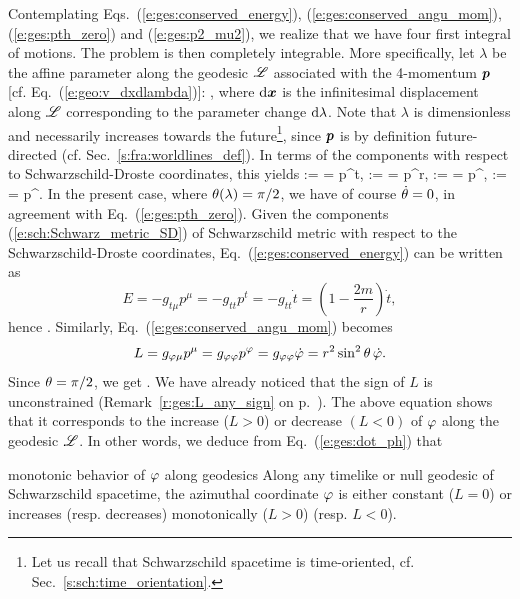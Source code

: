 Contemplating Eqs.~(\ref{e:ges:conserved_energy}), (\ref{e:ges:conserved_angu_mom}),
(\ref{e:ges:pth_zero}) and (\ref{e:ges:p2_mu2}), we realize that we have
four first integral of motions. The problem is then completely integrable.
More specifically, let $\lambda$ be the affine parameter along the geodesic
$\mathscr{L}$ associated with the 4-momentum $\bm{p}$ [cf. Eq.~(\ref{e:geo:v_dxdlambda})]:
\be \label{e:ges:def_lambda}
   ,
\ee
where  $\mathrm{d}\bm{x}$ is the infinitesimal displacement along $\mathscr{L}$ corresponding
to the parameter change $\mathrm{d}\lambda$. Note that $\lambda$ is dimensionless
and necessarily increases towards the future\footnote{Let us recall
that Schwarzschild spacetime is time-oriented, cf. Sec.~\ref{s:sch:time_orientation}.},
since $\bm{p}$ is by definition future-directed (cf. Sec.~\ref{s:fra:worldlines_def}).
In terms of the components with respect to Schwarzschild-Droste coordinates,
this yields
\be \label{e:ges:comp_4_momentum}
     :=  = p^t,\qquad
     :=  = p^r,\qquad
    \dot{\th} := \frac{\D \th}{\D\lambda} = p^\th,\qquad
    \dot{\ph} := \frac{\D \ph}{\D\lambda} = p^\ph .
\ee
In the present case, where $\theta(\lambda)=\pi/2$, we have of course $\dot{\theta}=0$,
in agreement with Eq.~(\ref{e:ges:pth_zero}).
Given the components (\ref{e:sch:Schwarz_metric_SD}) of Schwarzschild metric
with respect to the Schwarzschild-Droste coordinates,
Eq.~(\ref{e:ges:conserved_energy}) can be written as
\[
    E = - g_{t\mu} p^\mu = - g_{tt} p^t = - g_{tt} \dot{t}
    = \left(1 - \frac{2m}{r} \right) \dot{t} ,
\]
hence
\be \label{e:ges:dot_t}
    .
\ee
Similarly, Eq.~(\ref{e:ges:conserved_angu_mom}) becomes
\[
    L = g_{\varphi\mu} p^\mu = g_{\varphi\varphi} p^\varphi  = g_{\varphi\varphi} \dot{\varphi}
        = r^2 \sin^2\theta \, \dot{\varphi} .
\]
Since $\theta=\pi/2$, we get
\be \label{e:ges:dot_ph}
     .
\ee
We have already noticed that the sign of $L$ is unconstrained (Remark~\ref{r:ges:L_any_sign} on p.~\pageref{r:ges:L_any_sign}). The above equation
shows that it corresponds to the increase ($L>0$) or decrease $(L<0)$
of $\varphi$ along the geodesic $\mathscr{L}$. In other words, we deduce from Eq.~(\ref{e:ges:dot_ph})
that
\begin{tprop}{monotonic behavior of $\varphi$ along geodesics}{}
Along any timelike or null geodesic of Schwarzschild spacetime,
the azimuthal coordinate $\varphi$ is either constant ($L=0$)
or increases (resp. decreases) monotonically ($L>0$) (resp. $L<0$).
\end{tprop}

